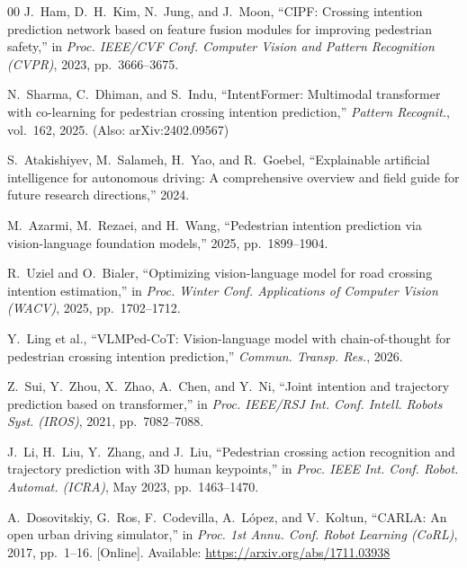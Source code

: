 \documentclass[conference]{IEEEtran}
\begin{document}
\begin{thebibliography}{00}
J.~Ham, D.~H.~Kim, N.~Jung, and J.~Moon, ``CIPF: Crossing intention prediction network based on feature fusion modules for improving pedestrian safety,'' in \emph{Proc. IEEE/CVF Conf. Computer Vision and Pattern Recognition (CVPR)}, 2023, pp.~3666--3675.

N.~Sharma, C.~Dhiman, and S.~Indu, ``IntentFormer: Multimodal transformer with co-learning for pedestrian crossing intention prediction,'' \emph{Pattern Recognit.}, vol.~162, 2025. (Also: arXiv:2402.09567)

S.~Atakishiyev, M.~Salameh, H.~Yao, and R.~Goebel, ``Explainable artificial intelligence for autonomous driving: A comprehensive overview and field guide for future research directions,'' 2024.

M.~Azarmi, M.~Rezaei, and H.~Wang, ``Pedestrian intention prediction via vision-language foundation models,'' 2025, pp.~1899--1904.

R.~Uziel and O.~Bialer, ``Optimizing vision-language model for road crossing intention estimation,'' in \emph{Proc. Winter Conf. Applications of Computer Vision (WACV)}, 2025, pp.~1702--1712.

Y.~Ling et al., ``VLMPed-CoT: Vision-language model with chain-of-thought for pedestrian crossing intention prediction,'' \emph{Commun. Transp. Res.}, 2026.

Z.~Sui, Y.~Zhou, X.~Zhao, A.~Chen, and Y.~Ni, ``Joint intention and trajectory prediction based on transformer,'' in \emph{Proc. IEEE/RSJ Int. Conf. Intell. Robots Syst. (IROS)}, 2021, pp.~7082--7088.

J.~Li, H.~Liu, Y.~Zhang, and J.~Liu, ``Pedestrian crossing action recognition and trajectory prediction with 3D human keypoints,'' in \emph{Proc. IEEE Int. Conf. Robot. Automat. (ICRA)}, May 2023, pp.~1463--1470.

A.~Dosovitskiy, G.~Ros, F.~Codevilla, A.~L\'{o}pez, and V.~Koltun, ``CARLA: An open urban driving simulator,'' in \emph{Proc. 1st Annu. Conf. Robot Learning (CoRL)}, 2017, pp.~1--16. [Online]. Available: \url{https://arxiv.org/abs/1711.03938}

\end{thebibliography}
\end{document}
